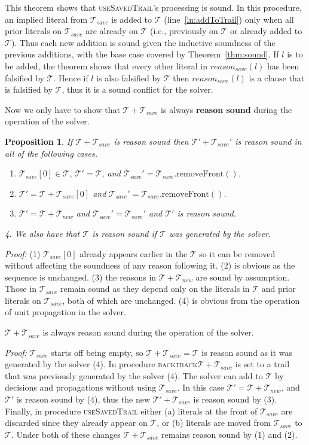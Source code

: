 \documentclass[runningheads]{llncs}
\newcommand{\trail}{\ensuremath{\mathcal{T}}}
\newcommand{\reasonsave}[1]{\ensuremath{\mathit{reason_{\mathit{save}}(#1)}}}
\newcommand{\trailsave}{\trail_{\mathit{save}}}
\newcommand{\bt}{\textsc{backtrack}\xspace}
\newcommand{\ust}{\textsc{useSavedTrail}\xspace}
\newtheorem{prop}{Proposition}
\newcommand{\whitebox}{\raisebox{.5ex}{\fbox{\hspace*{.2ex}}}}
\begin{document}
This theorem shows that \ust's processing is
sound. In this procedure, an implied literal from $\trailsave$ is added
to $\trail$ (line~\ref{ln:addToTrail}) only when all prior literals on
$\trailsave$ are already on $\trail$ (i.e., previously on $\trail$ or
already added to $\trail$). Thus each new addition is sound given the
inductive soundness of the previous additions, with the base case
covered by Theorem~\ref{thm:sound}. If $l$ is to be added, the theorem
shows that every other literal in $\reasonsave{l}$ has been falsified
by $\trail$. Hence if $l$ is also falsified by $\trail$ then
$\reasonsave{l}$ is a clause that is falsified by $\trail$, thus it is
a sound conflict for the solver.

Now we only have to show that $\trail+\trailsave$ is always
\textbf{reason sound} during the operation of the solver.
\begin{prop}
    \label{prop:sound}
    If $\trail+\trailsave$ is reason sound then $\trail'+\trailsave'$
    is reason sound in all of the following cases.
    \begin{enumerate}
    \item $\trailsave[0]\in \trail$, $\trail'=\trail$, and
        $\trailsave' = \trailsave.\mathrm{removeFront()}$.
    \item $\trail' = \trail+\trailsave[0]$ and
        $\trailsave' = \trailsave.\mathrm{removeFront()}$.
    \item $\trail' = \trail + \trail_{\mathit{new}}$ and
        $\trailsave' = \trailsave'$ and $\trail'$ is reason sound.
    \end{enumerate}
    4. We also have that $\trail$ is reason sound if $\trail$ was
    generated by the solver.
\end{prop}
\noindent \emph{Proof:} (1) $\trailsave[0]$ already appears earlier in
the $\trail$ so it can be removed without affecting the soundness of
any reason following it. (2) is obvious as the sequence is
unchanged. (3) the reasons in $\trail+\trail_{\mathit{new}}$ are sound
by assumption. Those in $\trailsave$ remain sound as they depend only
on the literals in $\trail$ and prior literals on $\trailsave$, both
of which are unchanged. (4) is obvious from the operation of unit
propagation in the solver.  \whitebox

\begin{theorem}
    \label{thm:rsound}
    $\trail+\trailsave$ is always reason sound during the operation of
    the solver.
\end{theorem}
\noindent \emph{Proof:} $\trailsave$ starts off being empty, so
$\trail+\trailsave = \trail$ is reason sound as it was generated by
the solver (4). In procedure \bt $\trail+\trailsave$ is
set to a trail that was previously generated by the solver (4). The solver
can add to $\trail$ by decisions and propagations without using
$\trailsave$. In this case $\trail' = \trail+\trail_{\mathit{new}}$,
and $\trail'$ is reason sound by (4), thus the new
$\trail'+\trailsave$ is reason sound by (3). Finally, in procedure
\ust either (a) literals at the front of
$\trailsave$ are discarded since they already appear on $\trail$, or
(b) literals are moved from $\trailsave$ to $\trail$. Under both of
these changes $\trail+\trailsave$ remains reason sound by (1) and (2).
\whitebox
\end{document}
